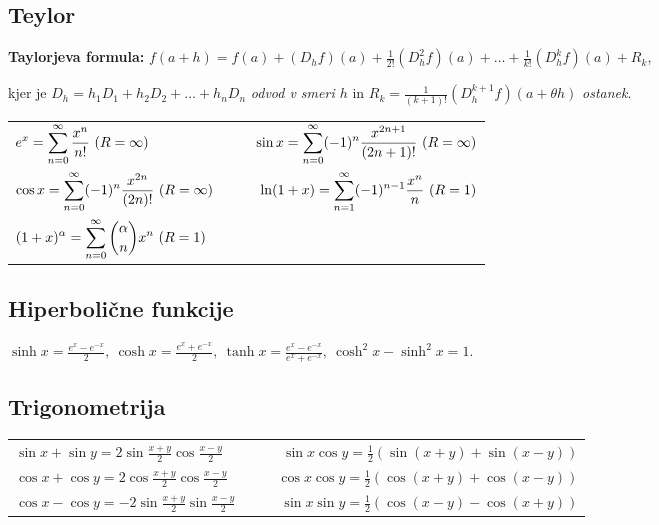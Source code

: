 \subsection{Teylor}
\textbf{Taylorjeva formula:} $\displaystyle f(a+h) = f(a) + (D_hf)(a) + \frac{1}{2!}(D_h^2f)(a) + \ldots + \frac{1}{k!} (D_h^kf)(a) + R_k$,

kjer je $D_h = h_1D_1 + h_2D_2 + \ldots + h_nD_n$ \emph{odvod v smeri $h$} in $R_k = \frac{1}{(k+1)!} (D_h^{k+1}f)(a + \theta h)$ \emph{ostanek}.
\begin{center}
    \begin{tabular}{ l r }
     \(\displaystyle e^x = \sum_{n=0}^{\infty} \frac{x^n}{n!} \ (R=\infty)\) & \(\ds \qquad \sin x = \sum_{n=0}^{\infty}(-1)^n \frac{x^{2n+1}}{(2n+1)!} \ (R=\infty)\) \\
     \(\ds \cos x = \sum_{n=0}^{\infty} (-1)^n \frac{x^{2n}}{(2n)!} \ (R=\infty)\) & \(\qquad \displaystyle \ln (1+x) = \sum_{n=1}^{\infty}(-1)^{n-1}\frac{x^n}{n} \ (R=1)\) \\
     \(\ds (1+x)^\alpha = \sum_{n=0}^{\infty}\binom{\alpha}{n}x^n \ (R=1)\)
    \end{tabular}
\end{center}

\subsection{Hiperbolične funkcije}
\(\displaystyle \sinh x = \frac{e^x - e^{-x}}{2}, \ \cosh x = \frac{e^x + e^{-x}}{2}, \ \tanh x = \frac{e^x - e^{-x}}{e^x + e^{-x}}, \ \cosh^2 x - \sinh^2 x = 1\).

\subsection{Trigonometrija}
\begin{center}
    \begin{tabular}{ l r }
     \(\sin x + \sin y = 2 \sin \frac{x+y}{2} \cos \frac{x-y}{2}\) & \(\qquad \sin x \cos y = \frac{1}{2}\left(\sin(x+y) + \sin (x-y)\right)\) \\ [0.5ex]
     \(\cos x + \cos y = 2 \cos \frac{x+y}{2} \cos \frac{x-y}{2}\) & \(\qquad \cos x \cos y = \frac{1}{2}\left(\cos(x+y) + \cos (x-y)\right)\) \\ [0.5ex]
     \(\cos x - \cos y = -2 \sin \frac{x+y}{2} \sin \frac{x-y}{2}\) & \(\qquad \sin x \sin y = \frac{1}{2}\left(\cos(x-y) - \cos (x+y)\right)\)
    \end{tabular}
\end{center}

